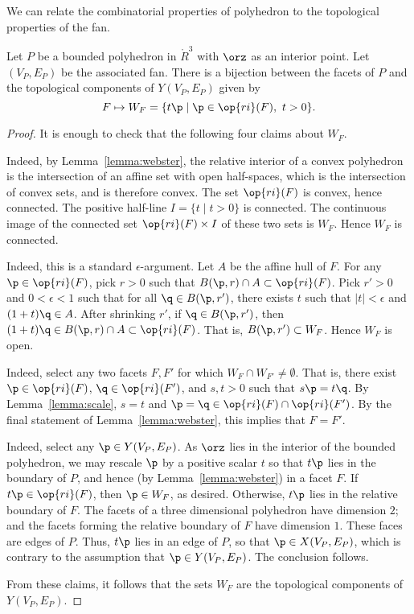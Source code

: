 We can relate the combinatorial properties of polyhedron to the topological
properties of the fan.

\begin{lemma}[]\label{lemma:WF} 
Let $P$ be a bounded polyhedron in $\ring{R}^3$ with $\orz$ as an
interior point.  Let $(V_P,E_P)$ be the associated fan.  There is a
bijection between the facets of $P$ and the topological components
of $Y(V_P,E_P)$ given by
\begin{displaymath}
F \mapsto W_F = \{t \p \mid \p\in \op{ri}(F),~t >0\}.
\end{displaymath}
\end{lemma}
%

\begin{proof} It is enough to check that the following four claims
about $W_F$.

 Indeed, by Lemma~\ref{lemma:webster},
the relative interior of a convex polyhedron is the intersection of
an affine set with open half-spaces, which is the intersection of
convex sets, and is therefore convex. The set $\op{ri}(F)$ is
convex, hence connected.  The positive half-line $I=\{t\mid t>0\}$
is connected.  The continuous image of the connected set
$\op{ri}(F)\times I$ of these two sets is $W_F$.  Hence $W_F$ is
connected.

  Indeed, this is a standard
$\epsilon$-argument.  Let $A$ be the affine hull of $F$.  For any
$\p\in \op{ri}(F)$, pick $r>0$ such that $B(\p,r)\cap A\subset
\op{ri}(F)$.  Pick $r'>0$ and $0<\epsilon<1$ such that for all
$\q\in B(\p,r')$, there exists $t$ such that $|t|<\epsilon$ and
$(1+t)\q\in A$.  After shrinking $r'$, if $\q\in B(\p,r')$, then
$(1+t)\q \in B(\p,r)\cap A \subset \op{ri}(F)$.  That is,
$B(\p,r')\subset W_F$.  Hence $W_F$ is open.

  Indeed, select any two facets $F,F'$ for
which $W_F\cap W_{F'}\ne \emptyset$.  That is, there exist $\p\in
\op{ri}(F)$, $\q\in \op{ri}(F')$, and $s,t>0$ such that $s \p = t
\q$.  By Lemma~\ref{lemma:scale}, $s=t$ and $\p=\q\in \op{ri}(F)\cap
\op{ri}(F')$.  By the final statement of Lemma~\ref{lemma:webster},
this implies that $F=F'$.

  Indeed,
select any $\p\in Y(V_P,E_P)$.  As $\orz$ lies in the interior of
the bounded polyhedron, we may rescale $\p$ by a positive scalar $t$
so that $t \p$ lies in the boundary of $P$, and hence (by
Lemma~\ref{lemma:webster}) in a facet $F$.  If $t \p \in
\op{ri}(F)$, then $\p\in W_F$, as desired.  Otherwise, $t \p$ lies
in the relative boundary of $F$.  The facets of a three dimensional
polyhedron have dimension $2$; and the facets forming the relative
boundary of $F$ have dimension $1$.  These faces are edges of $P$.
Thus, $t \p$ lies in an edge of $P$, so that $\p\in X(V_P,E_P)$,
which is contrary to the assumption that $\p\in Y(V_P,E_P)$.  The
conclusion follows.

From these claims, it follows that the sets $W_F$ are the
topological components of $Y(V_P,E_P)$.
\end{proof}
